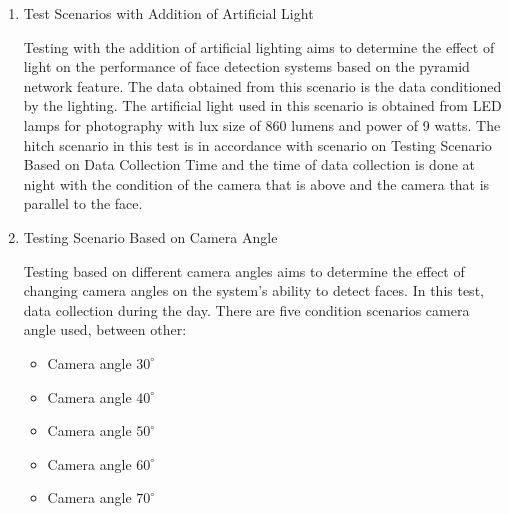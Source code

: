 \begin{enumerate}
  \item Test Scenarios with Addition of Artificial Light
  
  Testing with the addition of artificial lighting aims to determine the effect of
  light on the performance of face detection systems based on the pyramid network feature.
  The data obtained from this scenario is the data conditioned by the lighting.
  The artificial light used in this scenario is obtained from LED lamps for photography with
  lux size of 860 lumens and power of 9 watts. The hitch scenario in this test is in accordance with 
  scenario on Testing Scenario Based on Data Collection Time and the time of data collection is done at night with
  the condition of the camera that is above and the camera that is parallel to the face.
  
  \item Testing Scenario Based on Camera Angle
  
  Testing based on different camera angles aims
  to determine the effect of changing camera angles on
  the system's ability to detect faces. In this test,
  data collection during the day. There are five condition scenarios
  camera angle used, between
  other:

  \begin{itemize}
    \item Camera angle $30^\circ$
    \item Camera angle $40^\circ$
    \item Camera angle $50^\circ$
    \item Camera angle $60^\circ$
    \item Camera angle $70^\circ$
  \end{itemize}
  
\end{enumerate}






